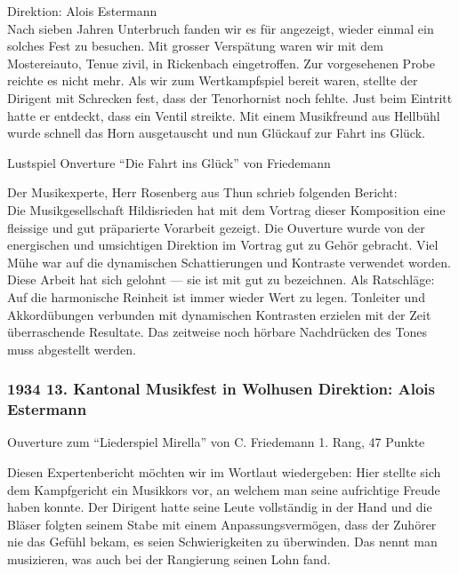 \begin{history}
    Direktion: Alois Estermann\\
    Nach sieben Jahren Unterbruch fanden wir es für angezeigt, wieder einmal ein
    solches Fest zu besuchen. Mit grosser Verspätung waren wir mit dem
    Mostereiauto, Tenue zivil, in Rickenbach eingetroffen. Zur vorgesehenen
    Probe reichte es nicht mehr. Als wir zum Wertkampfspiel bereit waren,
    stellte der Dirigent mit Schrecken fest, dass der Tenorhornist noch fehlte.
    Just beim Eintritt hatte er entdeckt, dass ein Ventil streikte. Mit einem
    Musikfreund aus Hellbühl wurde schnell das Horn ausgetauscht und nun
    Glückauf zur Fahrt ins Glück.

    Lustspiel Onverture \enquote{Die Fahrt ins Glück} von Friedemann

    Der Musikexperte, Herr Rosenberg aus Thun schrieb folgenden Bericht:\\
    Die Musikgesellschaft Hildisrieden hat mit dem Vortrag dieser Komposition
    eine fleissige und gut präparierte Vorarbeit gezeigt. Die Ouverture wurde
    von der energischen und umsichtigen Direktion im Vortrag gut zu Gehör
    gebracht. Viel Mühe war auf die dynamischen Schattierungen und Kontraste
    verwendet worden. Diese Arbeit hat sich gelohnt — sie ist mit gut zu
    bezeichnen. Als Ratschläge: Auf die harmonische Reinheit ist immer wieder
    Wert zu legen. Tonleiter und Akkordübungen verbunden mit dynamischen
    Kontrasten erzielen mit der Zeit überraschende Resultate. Das zeitweise noch
    hörbare Nachdrücken des Tones muss abgestellt werden.


    \subsubsection*{1934 13. Kantonal Musikfest in Wolhusen Direktion: Alois Estermann}


    Ouverture zum \enquote{Liederspiel Mirella} von C. Friedemann 1. Rang, 47
    Punkte

    Diesen Expertenbericht möchten wir im Wortlaut wiedergeben: Hier stellte
    sich dem Kampfgericht ein Musikkors vor, an welchem man seine aufrichtige
    Freude haben konnte. Der Dirigent hatte seine Leute vollständig in der Hand
    und die Bläser folgten seinem Stabe mit einem Anpassungsvermögen, dass der
    Zuhörer nie das Gefühl bekam, es seien Schwierigkeiten zu überwinden. Das
    nennt man musizieren, was auch bei der Rangierung seinen Lohn fand.


\end{history}
